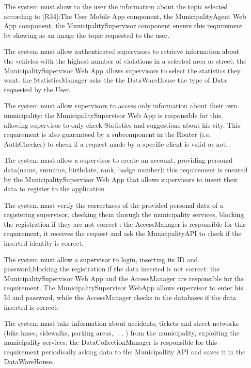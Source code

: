 \documentclass[a4paper]{report}
\begin{document}
\begin{enumerate}[start=1,label={[R\arabic*]}]
\item The system must show to the user the information about the topic selected according to [R34]:The User Mobile App component, the MunicipalityAgent Web App component, the MunicipalitySupervisor component ensure this requirement by showing as an image the topic requested to the user.
\item The system must allow authenticated supervisors to retrieve information about the vehicles with the highest number of violations in a selected area or street: the MunicipalitySupervisor Web App allows supervisors to select the statistics they want; the StatisticsManager asks the the DataWareHouse the type of Data requested by the User.
\item The system must allow supervisors to access only information about their own municipality: the MunicipalitySupervisor Web App  is responsible for this, allowing supervisor to only check Statistics and suggestions about his city. This requirement is also guaranteed by a subcomponent in the Router (i.e. AuthChecker) to check if a request made by a specific client is valid or not.
\item The system must allow a supervisor to create an account, providing personal data(name, surname, birthdate, rank,     badge number): this requirement is ensured by  the MunicipalitySupervisor Web App that allows supervisors to insert their data to register to the application
\item The system must verify the correctness of the provided personal data of a registering supervisor, checking them thorugh the municipality services, blocking the registration if they are not correct : the AccessManager is responsible for this requirement, it receives the request and ask the MunicipalityAPI to check if the inserted identity is correct.
\item The system must allow a supervisor to login, inserting its ID and password,blocking the registration if the data inserted is not correct: the MunicipalitySupervisor Web App and the AccessManager are responsible for the requirement. The MunicipalitySupervisor WebApp allows supervisor to enter his Id and password, while the AccessManager checks in the databases if the data inserted is correct.
\item The system must take information about accidents, tickets and street networks (bike lanes, sidewalks, parking areas,. . . ) from the municipality, exploiting the municipality services: the DataCollectionManager is responsible for this requirement periodically asking data to the Municipallity API and saves it in the DataWareHouse.

\end{enumerate}
\end{document}
